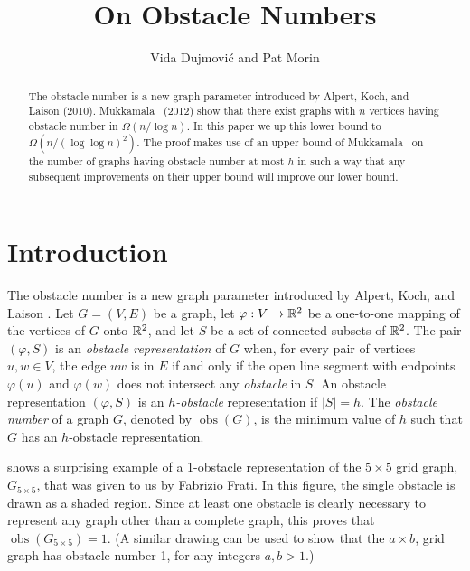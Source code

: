 \documentclass{patmorin}
\title{On Obstacle Numbers}
\author{Vida Dujmovi\'c and Pat Morin}
\DeclareMathOperator{\obs}{obs}
\begin{document}
\begin{titlepage}
\maketitle

\begin{abstract}
The obstacle number is a new graph parameter introduced by Alpert, Koch,
and Laison (2010).  Mukkamala \etal\ (2012) show that there exist graphs
with $n$ vertices having obstacle number in $\Omega(n/\log n)$. In this
paper we up this lower bound to $\Omega(n/(\log\log n)^2)$.  The proof
makes use of an upper bound of Mukkamala \etal\ on the number of graphs
having obstacle number at most $h$ in such a way that any subsequent
improvements on their upper bound will improve our lower bound.
\end{abstract}
\end{titlepage}

\section{Introduction}

The obstacle number is a new graph parameter introduced by Alpert, Koch,
and Laison \cite{alpert.koch.ea:obstacle}.  Let $G=(V,E)$ be a graph,
let $\varphi:V\to \mathbb{R}^2$ be a one-to-one mapping of the vertices of
$G$ onto $\mathbb{R}^2$, and let $S$ be a set of connected subsets of $\mathbb{R}^2$.
The pair $(\varphi,S)$ is an \emph{obstacle representation} of $G$ when,
for every pair of vertices $u,w\in V$, the edge $uw$ is in $E$ if and only
if the open line segment with endpoints $\varphi(u)$ and $\varphi(w)$ does
not intersect any \emph{obstacle} in $S$.  An obstacle representation
$(\varphi,S)$ is an \emph{$h$-obstacle} representation if $|S|=h$.
The \emph{obstacle number} of a graph $G$, denoted by $\obs(G)$, is the
minimum value of $h$ such that $G$ has an $h$-obstacle representation.

 shows a surprising example of a 1-obstacle
representation of the $5\times 5$ grid graph, $G_{5\times 5}$, that
was given to us by Fabrizio Frati. In this figure, the single obstacle
is drawn as a shaded region. Since at least one obstacle is clearly
necessary to represent any graph other than a complete graph, this
proves that $\obs(G_{5\times 5}) = 1$.  (A similar drawing can be used
to show that the $a\times b$, grid graph has obstacle number 1, for any
integers $a,b>1$.)
\end{document}
